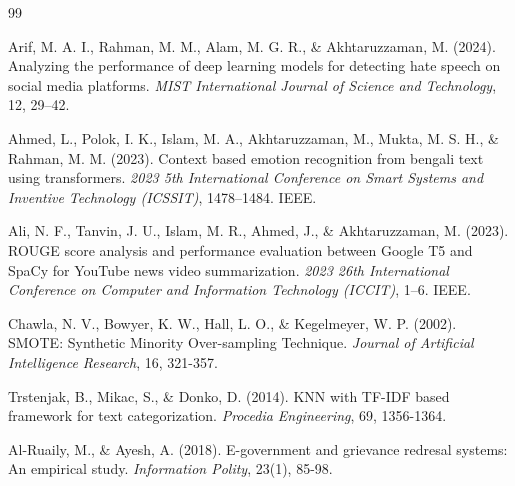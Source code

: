 \documentclass[a4paper,fleqn]{cas-dc}
\begin{document}
\begin{thebibliography}{99}

Arif, M. A. I., Rahman, M. M., Alam, M. G. R., \& Akhtaruzzaman, M. (2024). 
Analyzing the performance of deep learning models for detecting hate speech on social media platforms. 
\textit{MIST International Journal of Science and Technology}, 12, 29--42.

Ahmed, L., Polok, I. K., Islam, M. A., Akhtaruzzaman, M., Mukta, M. S. H., \& Rahman, M. M. (2023). 
Context based emotion recognition from bengali text using transformers. 
\textit{2023 5th International Conference on Smart Systems and Inventive Technology (ICSSIT)}, 1478--1484. IEEE.

Ali, N. F., Tanvin, J. U., Islam, M. R., Ahmed, J., \& Akhtaruzzaman, M. (2023). 
ROUGE score analysis and performance evaluation between Google T5 and SpaCy for YouTube news video summarization. 
\textit{2023 26th International Conference on Computer and Information Technology (ICCIT)}, 1--6. IEEE.

Chawla, N. V., Bowyer, K. W., Hall, L. O., \& Kegelmeyer, W. P. (2002).
SMOTE: Synthetic Minority Over-sampling Technique.
\textit{Journal of Artificial Intelligence Research}, 16, 321-357.

Trstenjak, B., Mikac, S., \& Donko, D. (2014).
KNN with TF-IDF based framework for text categorization.
\textit{Procedia Engineering}, 69, 1356-1364.

Al-Ruaily, M., \& Ayesh, A. (2018).
E-government and grievance redresal systems: An empirical study.
\textit{Information Polity}, 23(1), 85-98.

\end{thebibliography}
\end{document}
